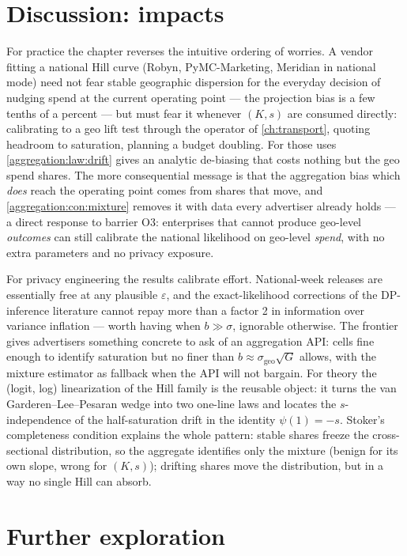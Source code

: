 \section{Discussion: impacts}

For practice the chapter reverses the intuitive ordering of worries. A vendor fitting a national Hill curve (Robyn, PyMC-Marketing, Meridian in national mode) need not fear stable geographic dispersion for the everyday decision of nudging spend at the current operating point --- the projection bias is a few tenths of a percent --- but must fear it whenever $(K,s)$ are consumed directly: calibrating to a geo lift test through the operator of \cref{ch:transport}, quoting headroom to saturation, planning a budget doubling. For those uses \cref{aggregation:law:drift} gives an analytic de-biasing that costs nothing but the geo spend shares. The more consequential message is that the aggregation bias which \emph{does} reach the operating point comes from shares that move, and \cref{aggregation:con:mixture} removes it with data every advertiser already holds --- a direct response to barrier O3: enterprises that cannot produce geo-level \emph{outcomes} can still calibrate the national likelihood on geo-level \emph{spend}, with no extra parameters and no privacy exposure.

For privacy engineering the results calibrate effort. National-week releases are essentially free at any plausible $\varepsilon$, and the exact-likelihood corrections of the DP-inference literature cannot repay more than a factor 2 in information over variance inflation --- worth having when $b \gg \sigma$, ignorable otherwise. The frontier gives advertisers something concrete to ask of an aggregation API: cells fine enough to identify saturation but no finer than $b \approx \sigma_{\mathrm{geo}}\sqrt{G}$ allows, with the mixture estimator as fallback when the API will not bargain. For theory the (logit, log) linearization of the Hill family is the reusable object: it turns the van Garderen--Lee--Pesaran wedge into two one-line laws and locates the $s$-independence of the half-saturation drift in the identity $\psi(1) = -s$. Stoker's completeness condition explains the whole pattern: stable shares freeze the cross-sectional distribution, so the aggregate identifies only the mixture (benign for its own slope, wrong for $(K,s)$); drifting shares move the distribution, but in a way no single Hill can absorb.

\section{Further exploration}

